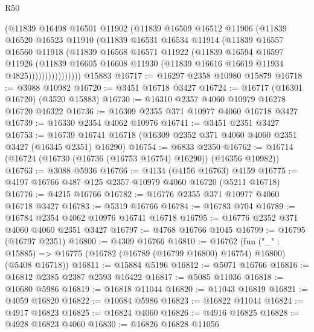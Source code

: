 \begin{lexlean}{R50}
\begin{coremodule}
                  (@11839
                    @16498
                    @16501
                    @11902
                    (@11839
                      @16509
                      @16512
                      @11906
                      (@11839
                        @16520
                        @16523
                        @11910
                        (@11839
                          @16531
                          @16534
                          @11914
                          (@11839
                            @16557
                            @16560
                            @11918
                            (@11839
                              @16568
                              @16571
                              @11922
                              (@11839
                                @16594
                                @16597
                                @11926
                                (@11839
                                  @16605
                                  @16608
                                  @11930
                                  (@11839 @16616 @16619 @11934 @4825))))))))))))))))
    @15883
@16717 := @16297 @2358 @10980 @15879
@16718 := @3088 @10982
@16720 := @3451 @16718 @3427
@16724 := @16717 (@16301 @16720) (@3520 @15883)
@16730 := @16310 @2357 @4060 @10979 @16278 @16720 @16322
@16736 := @16309 @2355 @371 @10977 @4060 @16718 @3427
@16739 := @16330 @2354 @4062 @10976
@16741 := @3451 @2351 @3427
@16753 := @16739 @16741 @16718 (@16309 @2352 @371 @4060 @4060 @2351 @3427 (@16345 @2351) @16290)
@16754 := @6833 @2350
@16762 := @16714 (@16724 (@16730 (@16736 (@16753 @16754) @16290)) (@16356 @10982))
@16763 := @3088 @5936
@16766 := @4134 (@4156 @16763) @4159
@16775 := @4197 @16766 @487 @125 @2357 @10979 @4060 @16720 (@5211 @16718)
@16776 := @4215 @16766
@16782 := @16776 @2355 @371 @10977 @4060 @16718 @3427
@16783 := @5319 @16766
@16784 := @16783 @704
@16789 := @16784 @2354 @4062 @10976 @16741 @16718
@16795 := @16776 @2352 @371 @4060 @4060 @2351 @3427
@16797 := @4768 @16766 @1045
@16799 := @16795 (@16797 @2351)
@16800 := @4309 @16766
@16810 := @16762
    (fun ("_" : @15885) => @16775 (@16782 (@16789 (@16799 @16800) @16754) @16800) (@5408 @16718))
@16811 := @15884 @5196
@16812 := @5071 @16766
@16816 := @16812 @2385 @2387 @2593 @16422
@16817 := @5085 @11036
@16818 := @10680 @5986
@16819 := @16818 @11044
@16820 := @11043 @16819
@16821 := @4059 @16820
@16822 := @10684 @5986
@16823 := @16822 @11044
@16824 := @4917 @16823
@16825 := @16824 @4060
@16826 := @4916 @16825
@16828 := @4928 @16823 @4060
@16830 := @16826 @16828 @11056

\end{coremodule}
\end{lexlean}
